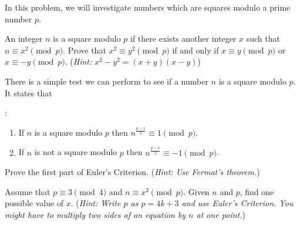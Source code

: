 \documentclass[12pt,twoside]{article}
\newcommand{\hint}[1]{({\it Hint: #1})}
\begin{document}


\begin{problem}{20} In this problem, we will investigate numbers which are squares modulo a prime number $p$.

\bparts

 An integer $n$ is a square modulo $p$ if there exists another integer $x$ such that $n \equiv x^2  \pmod p$. Prove that $x^2 \equiv y^2 \pmod p$ if and only if $x \equiv y \pmod p$ or $x \equiv -y \pmod p$.
\hint{$x^2-y^2 = (x+y)(x-y)$}


 There is a simple test we can perform to see if a number $n$ is a square modulo $p$. It states that
\begin{theorem}
:
\begin{enumerate}
\item If $n$ is a square modulo $p$ then $n^{\frac{p-1}{2}} \equiv 1 \pmod p$.
\item If $n$ is not a square modulo $p$ then $n^{\frac{p-1}{2}} \equiv -1 \pmod p$.
\end{enumerate} 
\end{theorem}

Prove the first part of Euler's Criterion.
\hint{Use Fermat's theorem.}


Assume that $p \equiv 3 \pmod 4$ and $n \equiv x^2 \pmod p$. Given $n$ and $p$, find one possible value of $x$.
\hint{Write $p$ as $p=4k+3$ and use Euler's Criterion. You might have to multiply two sides of an equation by $n$ at one point.}


\eparts

\end{problem}
\end{document}

